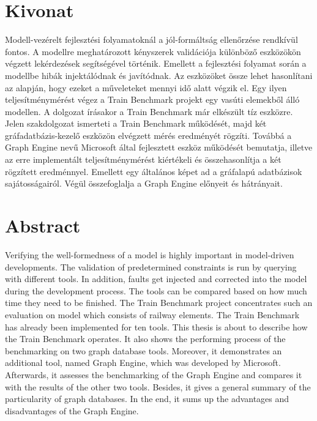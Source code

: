 \setcounter{page}{1}

\selecthungarian

\chapter*{Kivonat}

Modell-vezérelt fejlesztési folyamatoknál a jól-formáltság ellenőrzése rendkívül fontos. A modellre meghatározott kényszerek validációja különböző eszközökön végzett lekérdezések segítségével történik. Emellett a fejlesztési folyamat során a modellbe hibák injektálódnak és javítódnak. Az eszközöket össze lehet hasonlítani az alapján, hogy ezeket a műveleteket mennyi idő alatt végzik el. Egy ilyen teljesítménymérést végez a Train Benchmark projekt egy vasúti elemekből álló modellen. A dolgozat írásakor a Train Benchmark már elkészült tíz eszközre. Jelen szakdolgozat ismerteti a Train Benchmark működését, majd két gráfadatbázis-kezelő eszközön elvégzett mérés eredményét rögzíti. Továbbá a Graph Engine nevű Microsoft által fejlesztett eszköz működését bemutatja, illetve az erre implementált teljesítménymérést kiértékeli és összehasonlítja a két rögzített eredménnyel. Emellett egy általános képet ad a gráfalapú adatbázisok sajátosságairól. Végül összefoglalja a Graph Engine előnyeit és hátrányait.

\vfill
\selectenglish


\chapter*{Abstract}

Verifying the well-formedness of a model is highly important in model-driven developments. The validation of predetermined constraints is run by querying with different tools. In addition, faults get injected and corrected into the model during the development process. The tools can be compared based on how much time they need to be finished. The Train Benchmark project concentrates such an evaluation on model which consists of railway elements. The Train Benchmark has already been implemented for ten tools. This thesis is about to describe how the Train Benchmark operates. It also shows the performing process of the benchmarking on two graph database tools. Moreover, it demonstrates an additional tool, named Graph Engine, which was developed by Microsoft. Afterwards, it assesses the benchmarking of the Graph Engine and compares it with the results of the other two tools. Besides, it gives a general summary of the particularity of graph databases. In the end, it sums up the advantages and disadvantages of the Graph Engine.

\vfill
\selectthesislanguage

\setcounter{romanPage}{\value{page}}
